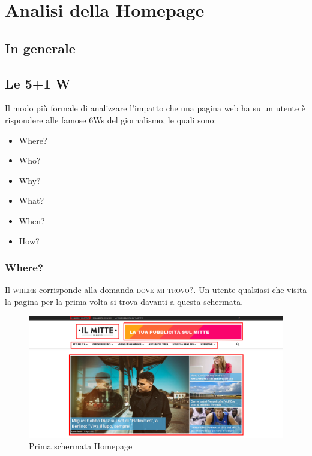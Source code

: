 \newpage
\section{Analisi della Homepage}
\subsection{In generale}


\subsection{Le 5+1 W}
Il modo più formale di analizzare l'impatto che una pagina web ha su un utente è rispondere alle famose 6Ws del giornalismo, le quali sono:
\begin{itemize}
\item Where?
\item Who?
\item Why?
\item What?
\item When?
\item How?
\end{itemize}

\subsubsection{Where?}
Il \textsc{where} corrisponde alla domanda \textsc{dove mi trovo?}. Un utente qualsiasi che visita la pagina per la prima volta si trova davanti a questa schermata.

\vspace{30pt}
\begin{figure}[htbp]
\begin{center}
\includegraphics[width=35em]{img/home1}
\caption{Prima schermata Homepage}
\end{center}
\end{figure}
\vspace{30pt}

